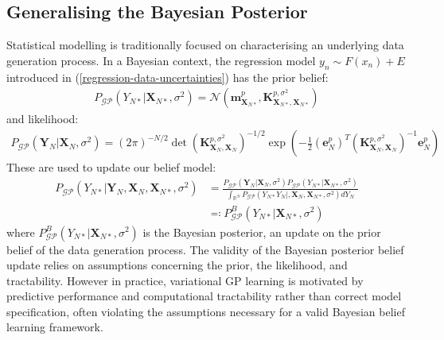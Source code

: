 \documentclass{article}
\newcommand{\GP}{\operatorname{\mathcal{GP}}}
\numberwithin{equation}{section}
\begin{document}
\subsection{Generalising the Bayesian Posterior}
Statistical modelling is traditionally focused on characterising an underlying data generation process. In a Bayesian context, the regression model $y_n \sim F(x_n) + E$ introduced in (\ref{regression-data-uncertainties}) has the prior belief:
\begin{align}
    P_{\GP}\left(Y_{N*}\vert \mathbf{X}_{N*}, \sigma^2\right) = \mathcal{N}\left(\mathbf{m}^p_{\mathbf{X}_{N*}}, \mathbf{K}^{p, \sigma^2}_{\mathbf{X}_{N*}, \mathbf{X}_{N*}}\right)
    \label{gp-prior-normal}
\end{align}
and likelihood:
\begin{align}
    P_{\GP}\left(\mathbf{Y}_N|\mathbf{X}_N, \sigma^2\right) = \left(2 \pi\right)^{-N/2} \det\left(\mathbf{K}^{p, \sigma^2}_{\mathbf{X}_{N}, \mathbf{X}_{N}}\right)^{-1/2} \exp\left(-\frac{1}{2}\left(\mathbf{e}^p_N\right)^T\left(\mathbf{K}^{p, \sigma^2}_{\mathbf{X}_{N}, \mathbf{X}_{N}}\right)^{-1}\mathbf{e}^p_N\right)
    \label{gp-likelihood-normal}
\end{align}
These are used to update our belief model: 
\begin{align}
\label{bayesian-posterior}
P_{\GP}\left(Y_{N*} \vert \mathbf{Y}_N, \mathbf{X}_N, \mathbf{X}_{N*}, \sigma^2 \right) &= \frac{P_{\GP}\left(\mathbf{Y}_N|\mathbf{X}_N, \sigma^2\right)P_{\GP}\left(Y_{N*}\vert \mathbf{X}_{N*}, \sigma^2\right)}{\int_{\mathbb{R}^{N}} P_{\GP}\left(Y_{N*} Y_N  \vert, \mathbf{X}_N, \mathbf{X}_{N*}, \sigma^2 \right) d Y_{N}} \\
\label{bayesian-posterior-definition}
&\eqqcolon P_{\GP}^B \left(Y_{N*} \vert\mathbf{X}_{N*}, \sigma^2 \right)
\end{align}
where $P_{\GP}^B \left(Y_{N*} \vert\mathbf{X}_{N*}, \sigma^2 \right)$ is the Bayesian posterior, an update on the prior belief of the data generation process. The validity of the Bayesian posterior belief update relies on assumptions concerning the prior, the likelihood, and tractability. However in practice, variational GP learning is motivated by predictive performance and computational tractability rather than correct model specification, often violating the assumptions necessary for a valid Bayesian belief learning framework.
\end{document}
